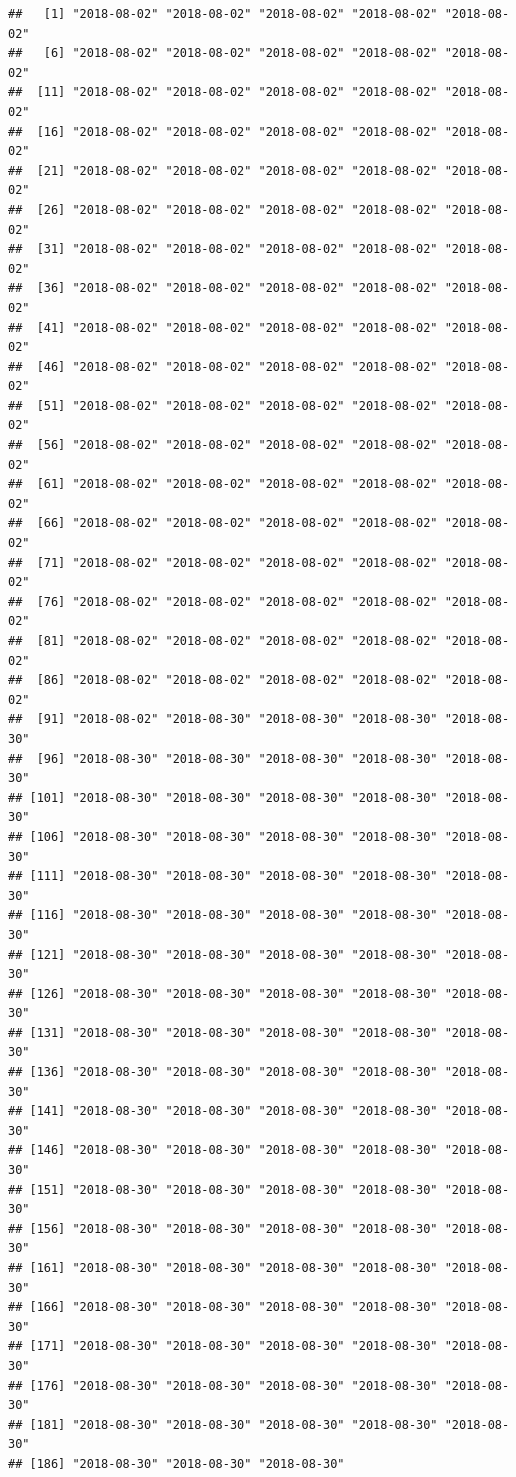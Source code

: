 \documentclass[]{article}
\begin{document}
\begin{verbatim}
##   [1] "2018-08-02" "2018-08-02" "2018-08-02" "2018-08-02" "2018-08-02"
##   [6] "2018-08-02" "2018-08-02" "2018-08-02" "2018-08-02" "2018-08-02"
##  [11] "2018-08-02" "2018-08-02" "2018-08-02" "2018-08-02" "2018-08-02"
##  [16] "2018-08-02" "2018-08-02" "2018-08-02" "2018-08-02" "2018-08-02"
##  [21] "2018-08-02" "2018-08-02" "2018-08-02" "2018-08-02" "2018-08-02"
##  [26] "2018-08-02" "2018-08-02" "2018-08-02" "2018-08-02" "2018-08-02"
##  [31] "2018-08-02" "2018-08-02" "2018-08-02" "2018-08-02" "2018-08-02"
##  [36] "2018-08-02" "2018-08-02" "2018-08-02" "2018-08-02" "2018-08-02"
##  [41] "2018-08-02" "2018-08-02" "2018-08-02" "2018-08-02" "2018-08-02"
##  [46] "2018-08-02" "2018-08-02" "2018-08-02" "2018-08-02" "2018-08-02"
##  [51] "2018-08-02" "2018-08-02" "2018-08-02" "2018-08-02" "2018-08-02"
##  [56] "2018-08-02" "2018-08-02" "2018-08-02" "2018-08-02" "2018-08-02"
##  [61] "2018-08-02" "2018-08-02" "2018-08-02" "2018-08-02" "2018-08-02"
##  [66] "2018-08-02" "2018-08-02" "2018-08-02" "2018-08-02" "2018-08-02"
##  [71] "2018-08-02" "2018-08-02" "2018-08-02" "2018-08-02" "2018-08-02"
##  [76] "2018-08-02" "2018-08-02" "2018-08-02" "2018-08-02" "2018-08-02"
##  [81] "2018-08-02" "2018-08-02" "2018-08-02" "2018-08-02" "2018-08-02"
##  [86] "2018-08-02" "2018-08-02" "2018-08-02" "2018-08-02" "2018-08-02"
##  [91] "2018-08-02" "2018-08-30" "2018-08-30" "2018-08-30" "2018-08-30"
##  [96] "2018-08-30" "2018-08-30" "2018-08-30" "2018-08-30" "2018-08-30"
## [101] "2018-08-30" "2018-08-30" "2018-08-30" "2018-08-30" "2018-08-30"
## [106] "2018-08-30" "2018-08-30" "2018-08-30" "2018-08-30" "2018-08-30"
## [111] "2018-08-30" "2018-08-30" "2018-08-30" "2018-08-30" "2018-08-30"
## [116] "2018-08-30" "2018-08-30" "2018-08-30" "2018-08-30" "2018-08-30"
## [121] "2018-08-30" "2018-08-30" "2018-08-30" "2018-08-30" "2018-08-30"
## [126] "2018-08-30" "2018-08-30" "2018-08-30" "2018-08-30" "2018-08-30"
## [131] "2018-08-30" "2018-08-30" "2018-08-30" "2018-08-30" "2018-08-30"
## [136] "2018-08-30" "2018-08-30" "2018-08-30" "2018-08-30" "2018-08-30"
## [141] "2018-08-30" "2018-08-30" "2018-08-30" "2018-08-30" "2018-08-30"
## [146] "2018-08-30" "2018-08-30" "2018-08-30" "2018-08-30" "2018-08-30"
## [151] "2018-08-30" "2018-08-30" "2018-08-30" "2018-08-30" "2018-08-30"
## [156] "2018-08-30" "2018-08-30" "2018-08-30" "2018-08-30" "2018-08-30"
## [161] "2018-08-30" "2018-08-30" "2018-08-30" "2018-08-30" "2018-08-30"
## [166] "2018-08-30" "2018-08-30" "2018-08-30" "2018-08-30" "2018-08-30"
## [171] "2018-08-30" "2018-08-30" "2018-08-30" "2018-08-30" "2018-08-30"
## [176] "2018-08-30" "2018-08-30" "2018-08-30" "2018-08-30" "2018-08-30"
## [181] "2018-08-30" "2018-08-30" "2018-08-30" "2018-08-30" "2018-08-30"
## [186] "2018-08-30" "2018-08-30" "2018-08-30"
\end{verbatim}
\end{document}
